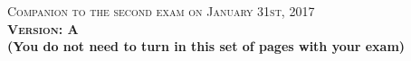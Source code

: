 \documentclass{docist}
\begin{document}
\thispagestyle{empty}

\begin{center}
  {\Large \textsc{Companion to the second exam on January 31st, 2017\\[2ex]
  \textbf{Version: A}\\[2ex]}}
  {\normalsize  \textbf{(You do not need to turn in this set of pages with your exam)}}
\end{center}






\qSoftwareArchitectureTwo



\qConcreteScenarios



\qAvailabilityScenarioTwo



\qAvailabilityINGLES



\qInfinispanThree



\qPerfomanceTacticTwo



\qModifiabilityScenario



\qAspectsTactics



\qHadoopStakeholdersEurosINGLES



\qHadoopHeartbeatINGLES



\qArchitecturalViews



\qFunctionalModule



\qSubcontractorsINGLES



\qUsesStyle



\qnginxModuleTypesINGLES



\qAdventureBuilderFour
\end{document}
